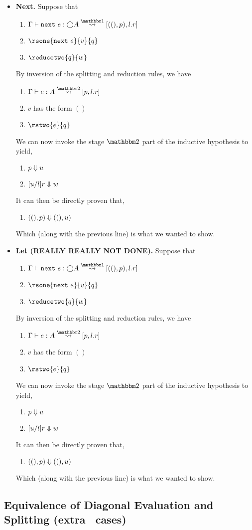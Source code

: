 \documentclass{article}
\begin{document}
\begin{itemize}
\item {\bf Next.} Suppose that
\begin{enumerate}
\item $\splitone{\next~e}{\fut A}{((),p),l.r}$
\item $\rsone{\next~e}{v}{q}$
\item $\reducetwo{q}{w}$
\end{enumerate}
By inversion of the splitting and reduction rules, we have
\begin{enumerate}
\item $\splittwo {e}{A}{p,l.r}$
\item $v$ has the form $()$
\item $\rstwo{e}{q}$
\end{enumerate}
We can now invoke the stage $\bbtwo$ part of the inductive hypothesis to yield,
\begin{enumerate}
\item ${p} \Downarrow {u}$
\item ${[u/l]r} \Downarrow {w}$
\end{enumerate}
It can then be directly proven that,
\begin{enumerate}
\item ${((),p)} \Downarrow {((),u)}$
\end{enumerate}
Which (along with the previous line) is what we wanted to show.

\item {\bf Let (REALLY REALLY NOT DONE).} Suppose that
\begin{enumerate}
\item $\splitone{\next~e}{\fut A}{((),p),l.r}$
\item $\rsone{\next~e}{v}{q}$
\item $\reducetwo{q}{w}$
\end{enumerate}
By inversion of the splitting and reduction rules, we have
\begin{enumerate}
\item $\splittwo {e}{A}{p,l.r}$
\item $v$ has the form $()$
\item $\rstwo{e}{q}$
\end{enumerate}
We can now invoke the stage $\bbtwo$ part of the inductive hypothesis to yield,
\begin{enumerate}
\item ${p} \Downarrow {u}$
\item ${[u/l]r} \Downarrow {w}$
\end{enumerate}
It can then be directly proven that,
\begin{enumerate}
\item ${((),p)} \Downarrow {((),u)}$
\end{enumerate}
Which (along with the previous line) is what we wanted to show.

\end{itemize}

\subsection {Equivalence of Diagonal Evaluation and Splitting (extra \lamStaged~cases)}



\end{document}

